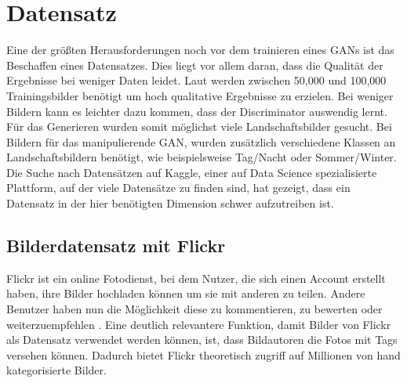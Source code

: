\chapter{Datensatz}\label{chp:datensatz} %
\glsresetall
Eine der größten Herausforderungen noch vor dem trainieren eines GANs ist das Beschaffen eines Datensatzes.  Dies liegt vor allem daran, dass die Qualität der Ergebnisse bei weniger Daten leidet. Laut   \cite{noauthor_nvidia_2020} werden zwischen 50,000 und 100,000 Trainingsbilder benötigt um hoch qualitative Ergebnisse zu erzielen. Bei weniger Bildern kann es leichter dazu kommen, dass der Discriminator auswendig lernt. Für das Generieren wurden somit möglichst viele Landschaftsbilder gesucht. Bei Bildern für das manipulierende GAN, wurden zusätzlich verschiedene Klassen an Landschaftsbildern  benötigt, wie beispielsweise Tag/Nacht oder Sommer/Winter. Die Suche nach Datensätzen auf Kaggle, einer auf Data Science spezialisierte Plattform, auf der viele Datensätze zu finden sind, hat gezeigt, dass ein Datensatz in der hier benötigten Dimension schwer aufzutreiben ist.

\section{Bilderdatensatz mit Flickr} %
Flickr ist ein online Fotodienst, bei dem Nutzer, die sich einen Account erstellt haben, ihre Bilder hochladen können um sie mit anderen zu teilen. Andere Benutzer haben nun die Möglichkeit diese zu kommentieren, zu bewerten oder weiterzuempfehlen \cite{noauthor_was_nodate}. Eine deutlich relevantere Funktion, damit Bilder von Flickr als Datensatz verwendet werden können, ist, dass Bildautoren die Fotos mit Tags versehen können. Dadurch bietet Flickr theoretisch zugriff auf Millionen von hand kategorisierte Bilder. 

